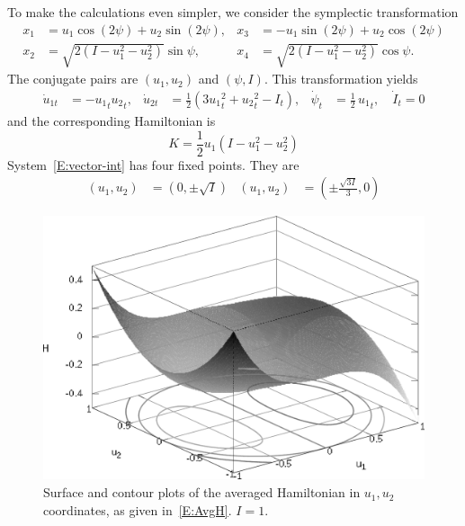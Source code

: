 To make the calculations even simpler, we consider the symplectic transformation
\begin{equation}
\label{E:combin_transf}
\begin{aligned}
x_1 &= u_1 \cos(2 \psi) + u_2 \sin(2 \psi), & x_3 &= -u_1 \sin(2 \psi) + u_2 \cos(2 \psi)\\
x_2 &= \sqrt {2 (I-u_1^2-u_2^2)} \sin \psi, & x_4 &= \sqrt {2 (I - u_1^2 - u_2^2)} \cos \psi.
\end{aligned}
\end{equation}
The conjugate pairs are $(u_1,u_2)$ and $(\psi,I)$. This transformation yields
\begin{align}
\label{E:vector-int}
\dot u_{1t} &= - {u_1}_t {u_2}_t , & \dot u_{2t} &= \frac12 (3 {u_1}_t^2 + {u_2}_t^2 -I_t), & \dot \psi_t &= \frac12\,{u_1}_t, \quad \dot I_t = 0
\end{align}
and the corresponding Hamiltonian is
\begin{equation}
K = \frac12 u_1 (I - u_1^2 - u_2^2)
\label{E:AvgH}
\end{equation}
System~\eqref{E:vector-int} has four fixed points. They are
\begin{align*}
(u_1, u_2) &= (0, \pm \sqrt{I}) & (u_1, u_2) &= (\pm \frac{\sqrt{3 I}}{3}, 0)
\end{align*}
\begin{figure}
\begin{center}
\includegraphics[width=\textwidth]{figures/h_surf}
\caption{Surface and contour plots of the averaged Hamiltonian in $u_1,u_2$ coordinates, as given in~\eqref{E:AvgH}. $I = 1$.}
\label{f:autoparam Hamiltonian}
\end{center}
\end{figure}

